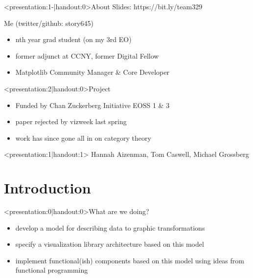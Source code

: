 \documentclass[xcolor={dvipsnames}]{beamer}
\begin{document}
\begin{frame}<presentation:1-|handout:0>{About}
    Slides: https://bit.ly/team329
    \begin{block}{Me (twitter/github: story645)}
        \begin{itemize}
            \item nth year grad student (on my 3rd EO)
            \item former adjunct at CCNY, former Digital Fellow
            \item Matplotlib Community Manager \& Core Developer
        \end{itemize}
    \end{block}

    \begin{block}<presentation:2|handout:0>{Project}
        \begin{itemize}
            \item Funded by Chan Zuckerberg Initiative EOSS 1 \& 3
            \item paper rejected by vizweek last spring
            \item work has since gone all in on category theory 
        \end{itemize}
    \end{block}
\end{frame}

\begin{frame}<presentation:1|handout:1>
	\titlepage
    Hannah Aizenman, Tom Caswell, Michael Grossberg\\
\end{frame}

\section{Introduction}
\begin{frame}<presentation:0|handout:0>{What are we doing?}
    \begin{itemize}
        \item develop a model for describing data to graphic transformations
        \item specify a visualization library architecture based on this model
        \item implement functional(ish) components based on this model using ideas from functional programming
    \end{itemize}
\end{frame}
\end{document}
